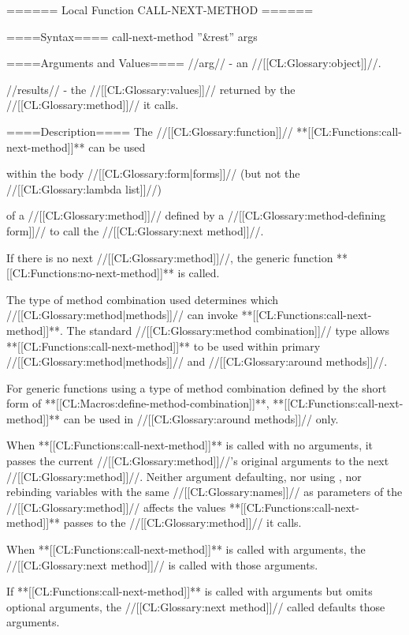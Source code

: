 ====== Local Function CALL-NEXT-METHOD ======

====Syntax====
\DefunWithValues call-next-method {''&rest'' args} {}

====Arguments and Values====
//arg// - an //[[CL:Glossary:object]]//.

//results// - the //[[CL:Glossary:values]]// returned by the //[[CL:Glossary:method]]// it calls.

====Description====
The //[[CL:Glossary:function]]// **[[CL:Functions:call-next-method]]** can be used

within the body //[[CL:Glossary:form|forms]]// (but not the //[[CL:Glossary:lambda list]]//)

of a //[[CL:Glossary:method]]// defined by a //[[CL:Glossary:method-defining form]]// to call the //[[CL:Glossary:next method]]//.

If there is no next //[[CL:Glossary:method]]//, the generic function **[[CL:Functions:no-next-method]]** is called.

The type of method combination used determines which //[[CL:Glossary:method|methods]]// can invoke **[[CL:Functions:call-next-method]]**. The standard //[[CL:Glossary:method combination]]// type allows **[[CL:Functions:call-next-method]]** to be used within primary //[[CL:Glossary:method|methods]]// and //[[CL:Glossary:around methods]]//.

For generic functions using a type of method combination defined by the short form of **[[CL:Macros:define-method-combination]]**, **[[CL:Functions:call-next-method]]** can be used in //[[CL:Glossary:around methods]]// only.

When **[[CL:Functions:call-next-method]]** is called with no arguments, it passes the current //[[CL:Glossary:method]]//'s original arguments to the next //[[CL:Glossary:method]]//. Neither argument defaulting, nor using , nor rebinding variables with the same //[[CL:Glossary:names]]// as parameters of the //[[CL:Glossary:method]]// affects the values **[[CL:Functions:call-next-method]]** passes to the //[[CL:Glossary:method]]// it calls.

When **[[CL:Functions:call-next-method]]** is called with arguments, the //[[CL:Glossary:next method]]// is called with those arguments.

If **[[CL:Functions:call-next-method]]** is called with arguments but omits optional arguments, the //[[CL:Glossary:next method]]// called defaults those arguments.

